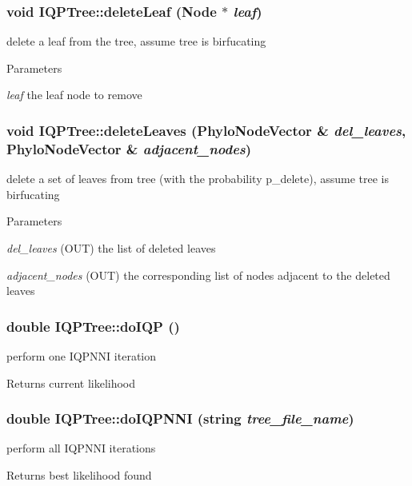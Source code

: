 \hypertarget{classIQPTree_a2e7b8c974f3d42a09bf652e8683d79f1}{
\subsubsection[{deleteLeaf}]{\setlength{\rightskip}{0pt plus 5cm}void IQPTree::deleteLeaf ({\bf Node} $\ast$ {\em leaf})}}
\label{classIQPTree_a2e7b8c974f3d42a09bf652e8683d79f1}
delete a leaf from the tree, assume tree is birfucating 
\begin{DoxyParams}{Parameters}
\item[{\em leaf}]the leaf node to remove \end{DoxyParams}
\hypertarget{classIQPTree_a038522be23c6a8fef71a2a1ffa983976}{
\subsubsection[{deleteLeaves}]{\setlength{\rightskip}{0pt plus 5cm}void IQPTree::deleteLeaves (PhyloNodeVector \& {\em del\_\-leaves}, \/  PhyloNodeVector \& {\em adjacent\_\-nodes})}}
\label{classIQPTree_a038522be23c6a8fef71a2a1ffa983976}
delete a set of leaves from tree (with the probability p\_\-delete), assume tree is birfucating 
\begin{DoxyParams}{Parameters}
\item[{\em del\_\-leaves}](OUT) the list of deleted leaves \item[{\em adjacent\_\-nodes}](OUT) the corresponding list of nodes adjacent to the deleted leaves \end{DoxyParams}
\hypertarget{classIQPTree_aa7d776139b6b10625fce6bc0cd33274d}{
\subsubsection[{doIQP}]{\setlength{\rightskip}{0pt plus 5cm}double IQPTree::doIQP ()}}
\label{classIQPTree_aa7d776139b6b10625fce6bc0cd33274d}
perform one IQPNNI iteration \begin{DoxyReturn}{Returns}
current likelihood 
\end{DoxyReturn}
\hypertarget{classIQPTree_af92cd63a37e644c51bb4006b07a32a53}{
\subsubsection[{doIQPNNI}]{\setlength{\rightskip}{0pt plus 5cm}double IQPTree::doIQPNNI (string {\em tree\_\-file\_\-name})}}
\label{classIQPTree_af92cd63a37e644c51bb4006b07a32a53}
perform all IQPNNI iterations \begin{DoxyReturn}{Returns}
best likelihood found 
\end{DoxyReturn}

